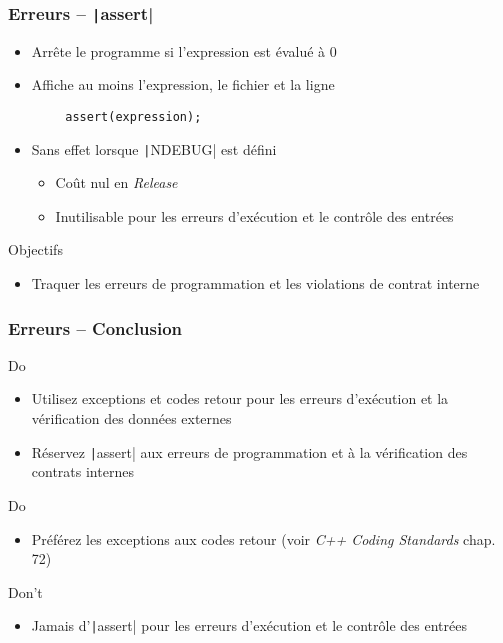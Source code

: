 \documentclass[C++.tex]{subfiles}
\begin{document}
\begin{frame}[fragile]
	\frametitle{Erreurs -- \texttt|assert|}
	\begin{itemize}
		\item Arrête le programme si l'expression est évalué à 0
		\item Affiche au moins l'expression, le fichier et la ligne
	\end{itemize}

	\begin{verbatim}
		assert(expression);
	\end{verbatim}

	\begin{itemize}
		\item Sans effet lorsque \texttt|NDEBUG| est défini
		\begin{itemize}
			\item Coût nul en \textit{Release}
			\item Inutilisable pour les erreurs d'exécution et le contrôle des entrées
		\end{itemize}
	\end{itemize}

	\begin{block}{Objectifs}
		\begin{itemize}
			\item Traquer les erreurs de programmation et les violations de contrat interne
		\end{itemize}
	\end{block}
\end{frame}

\begin{frame}[fragile]
	\frametitle{Erreurs -- Conclusion}
	\begin{exampleblock}{Do}
		\begin{itemize}
			\item Utilisez exceptions et codes retour pour les erreurs d'exécution et la vérification des données externes
			\item Réservez \texttt|assert| aux erreurs de programmation et à la vérification des contrats internes
		\end{itemize}
	\end{exampleblock}

	\begin{exampleblock}{Do}
		\begin{itemize}
			\item Préférez les exceptions aux codes retour (voir \textit{C++ Coding Standards} chap. 72)
		\end{itemize}
	\end{exampleblock}

	\begin{alertblock}{Don't}
		\begin{itemize}
			\item Jamais d'\texttt|assert| pour les erreurs d'exécution et le contrôle des entrées
		\end{itemize}
	\end{alertblock}
\end{frame}
\end{document}
